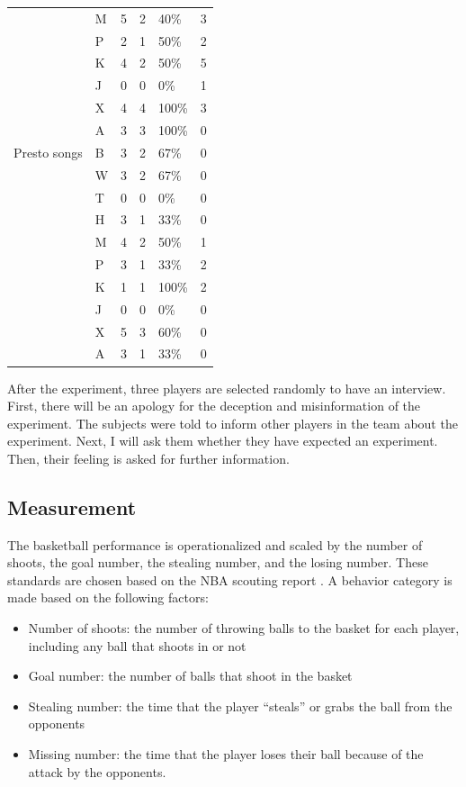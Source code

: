 \documentclass[man,floatsintext]{apa7}
\begin{document}
\begin{longtable}{@{}llllll@{}}
                       & M & 5 & 2 & 40\% & 3 \\
                       & P & 2 & 1 & 50\% & 2 \\
                       & K & 4 & 2 & 50\% & 5 \\
                       & J & 0 & 0 & 0\% & 1 \\
                       & X & 4 & 4 & 100\% & 3 \\
                       & A & 3 & 3 & 100\% & 0 \\
        \midrule
        Presto songs & B & 3 & 2 & 67\% & 0 \\
                     & W & 3 & 2 & 67\% & 0 \\
                     & T & 0 & 0 & 0\% & 0 \\
                     & H & 3 & 1 & 33\% & 0 \\
                     & M & 4 & 2 & 50\% & 1 \\
                     & P & 3 & 1 & 33\% & 2 \\
                     & K & 1 & 1 & 100\% & 2 \\
                     & J & 0 & 0 & 0\% & 0 \\
                     & X & 5 & 3 & 60\% & 0 \\
                     & A & 3 & 1 & 33\% & 0 \\

\end{longtable}

After the experiment, three players are selected randomly to have an interview. First, there will be an apology for the deception and misinformation of the experiment. The subjects were told to inform other players in the team about the experiment. Next, I will ask them whether they have expected an experiment. Then, their feeling is asked for further information.

\subsection{Measurement}
The basketball performance is operationalized and scaled by the number of shoots, the goal number, the stealing number, and the losing number. These standards are chosen based on the NBA scouting report \autocite{NBAZhongGuoGuanFangWangZhanQiuYuanZiLiao2024}. A behavior category is made based on the following factors:

\begin{itemize}
\item Number of shoots: the number of throwing balls to the basket for each player, including any ball that shoots in or not
\item Goal number: the number of balls that shoot in the basket
\item Stealing number: the time that the player ``steals'' or grabs the ball from the opponents
\item Missing number: the time that the player loses their ball because of the attack by the opponents.
\end{itemize}
\end{document}

